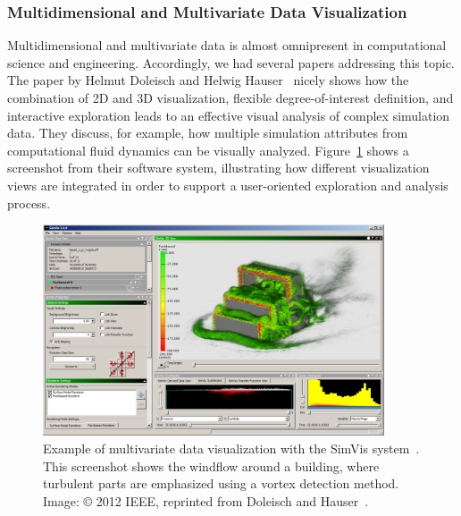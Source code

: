 \documentclass[10pt,journal,compsoc]{IEEEtran}
\begin{document}
\subsubsection{Multidimensional and Multivariate Data Visualization}

Multidimensional and multivariate data is almost omnipresent in computational science and engineering. Accordingly, we had several papers addressing this topic.
The paper by Helmut Doleisch and Helwig Hauser~\cite{Doleisch2012} nicely shows how the combination of 2D and 3D visualization, flexible degree-of-interest definition, and interactive exploration leads to an effective visual analysis of complex simulation data. They discuss, for example, how multiple simulation attributes from computational fluid dynamics can be visually analyzed. Figure~\ref{fig:simvis} shows a screenshot from their software system, illustrating how different visualization views are integrated in order to support a user-oriented exploration and analysis process.

\begin{figure}
    \begin{center}    
        \includegraphics[width=0.9\textwidth]{simvis.png}
        \caption{Example of multivariate data visualization with the SimVis system~\cite{Doleisch2012}. This screenshot shows the windflow around a building, where turbulent parts are emphasized using a vortex detection method. Image: \copyright{} 2012 IEEE, reprinted from Doleisch and Hauser~\cite{Doleisch2012}.
  \label{fig:simvis}}        
    \end{center}
\end{figure}
\end{document}
